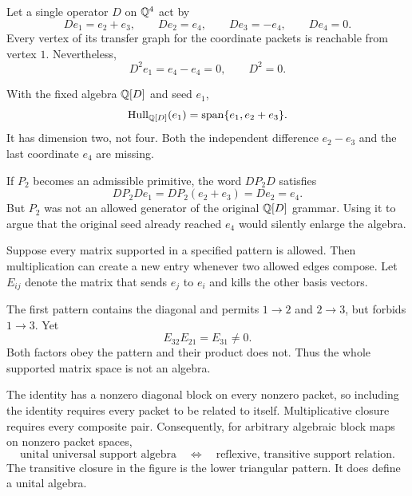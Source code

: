 Let a single operator $D$ on $\mathbb Q^4$ act by
\[
De_1=e_2+e_3,\qquad De_2=e_4,\qquad De_3=-e_4,\qquad De_4=0.
\]
Every vertex of its transfer graph for the coordinate packets is reachable from vertex $1$. Nevertheless,
\[
D^2e_1=e_4-e_4=0,\qquad D^2=0.
\]


With the fixed algebra $\mathbb Q[D]$ and seed $e_1$,
\[
\operatorname{Hull}_{\mathbb Q[D]}(e_1)=\operatorname{span}\{e_1,e_2+e_3\}.
\]
It has dimension two, not four. Both the independent difference $e_2-e_3$ and the last coordinate $e_4$ are missing.

If $P_2$ becomes an admissible primitive, the word $DP_2D$ satisfies
\[
DP_2De_1=DP_2(e_2+e_3)=De_2=e_4.
\]
But $P_2$ was not an allowed generator of the original $\mathbb Q[D]$ grammar. Using it to argue that the original seed already reached $e_4$ would silently enlarge the algebra.


Suppose every matrix supported in a specified pattern is allowed. Then multiplication can create a new entry whenever two allowed edges compose. Let $E_{ij}$ denote the matrix that sends $e_j$ to $e_i$ and kills the other basis vectors.


The first pattern contains the diagonal and permits $1\to2$ and $2\to3$, but forbids $1\to3$. Yet
\[
E_{32}E_{21}=E_{31}\ne0.
\]
Both factors obey the pattern and their product does not. Thus the whole supported matrix space is not an algebra.

The identity has a nonzero diagonal block on every nonzero packet, so including the identity requires every packet to be related to itself. Multiplicative closure requires every composite pair. Consequently, for arbitrary algebraic block maps on nonzero packet spaces,
\[
\boxed{\text{unital universal support algebra}
\quad\Longleftrightarrow\quad
\text{reflexive, transitive support relation}.}
\]
The transitive closure in the figure is the lower triangular pattern. It does define a unital algebra.


